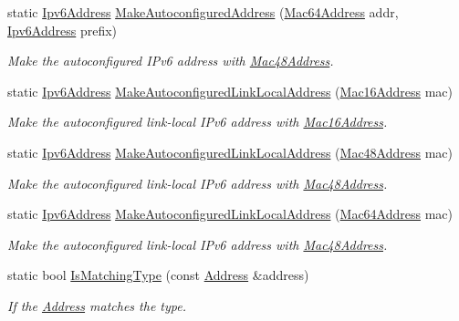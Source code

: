 \begin{DoxyCompactItemize}
static \hyperlink{classns3_1_1Ipv6Address}{Ipv6\+Address} \hyperlink{classns3_1_1Ipv6Address_a21bc56f8b47546dd9128458b8f7e0e5a}{Make\+Autoconfigured\+Address} (\hyperlink{classns3_1_1Mac64Address}{Mac64\+Address} addr, \hyperlink{classns3_1_1Ipv6Address}{Ipv6\+Address} prefix)
\begin{DoxyCompactList}\small\item\em Make the autoconfigured I\+Pv6 address with \hyperlink{classns3_1_1Mac48Address}{Mac48\+Address}. \end{DoxyCompactList}\item 
static \hyperlink{classns3_1_1Ipv6Address}{Ipv6\+Address} \hyperlink{classns3_1_1Ipv6Address_af57fd659aa3c06013ce1b75fb97f9fc5}{Make\+Autoconfigured\+Link\+Local\+Address} (\hyperlink{classns3_1_1Mac16Address}{Mac16\+Address} mac)
\begin{DoxyCompactList}\small\item\em Make the autoconfigured link-\/local I\+Pv6 address with \hyperlink{classns3_1_1Mac16Address}{Mac16\+Address}. \end{DoxyCompactList}\item 
static \hyperlink{classns3_1_1Ipv6Address}{Ipv6\+Address} \hyperlink{classns3_1_1Ipv6Address_aa885a11396b70ad7846dac67364bf5ef}{Make\+Autoconfigured\+Link\+Local\+Address} (\hyperlink{classns3_1_1Mac48Address}{Mac48\+Address} mac)
\begin{DoxyCompactList}\small\item\em Make the autoconfigured link-\/local I\+Pv6 address with \hyperlink{classns3_1_1Mac48Address}{Mac48\+Address}. \end{DoxyCompactList}\item 
static \hyperlink{classns3_1_1Ipv6Address}{Ipv6\+Address} \hyperlink{classns3_1_1Ipv6Address_a26e38fcf3c1855da2abb5901ad8913c5}{Make\+Autoconfigured\+Link\+Local\+Address} (\hyperlink{classns3_1_1Mac64Address}{Mac64\+Address} mac)
\begin{DoxyCompactList}\small\item\em Make the autoconfigured link-\/local I\+Pv6 address with \hyperlink{classns3_1_1Mac48Address}{Mac48\+Address}. \end{DoxyCompactList}\item 
static bool \hyperlink{classns3_1_1Ipv6Address_adbe329370b5a8f7c0f48659d6439dfd1}{Is\+Matching\+Type} (const \hyperlink{classns3_1_1Address}{Address} \&address)
\begin{DoxyCompactList}\small\item\em If the \hyperlink{classns3_1_1Address}{Address} matches the type. \end{DoxyCompactList}\item 

\end{DoxyCompactItemize}
